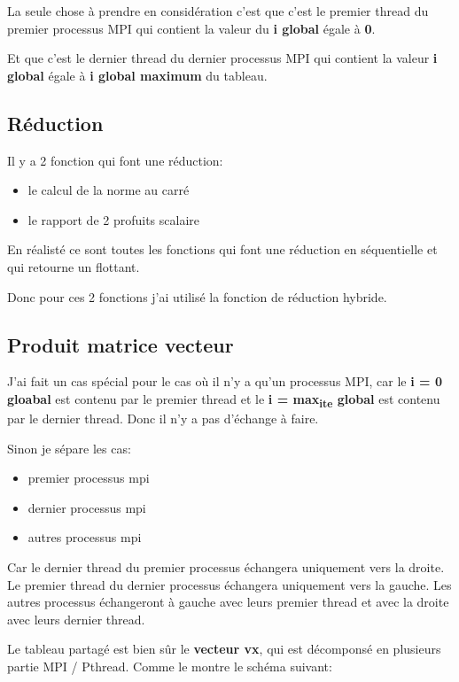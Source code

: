 \documentclass[11pt]{article}
\begin{document}
La seule chose à prendre en considération c'est que c'est le premier thread
du premier processus MPI qui contient la valeur du \textbf{i global} égale à \textbf{0}.

Et que c'est le dernier thread du dernier processus MPI qui contient la
valeur \textbf{i global} égale à \textbf{i global maximum} du tableau.

\subsection{Réduction}
\label{sec:orgbcc62b7}

Il y a 2 fonction qui font une réduction:
\begin{itemize}
\item le calcul de la norme au carré
\item le rapport de 2 profuits scalaire
\end{itemize}


En réalisté ce sont toutes les fonctions qui font une réduction en
séquentielle et qui retourne un flottant.

Donc pour ces 2 fonctions j'ai utilisé la fonction de réduction hybride.

\subsection{Produit matrice vecteur}
\label{sec:orgb18f4cb}

J'ai fait un cas spécial pour le cas où il n'y a qu'un processus MPI, car le
\textbf{i = 0 gloabal} est contenu par le premier thread et le \textbf{i = max\textsubscript{ite} global}
est contenu par le dernier thread. Donc il n'y a pas d'échange à faire.

Sinon je sépare les cas:
\begin{itemize}
\item premier processus mpi
\item dernier processus mpi
\item autres processus mpi
\end{itemize}


Car le dernier thread du premier processus échangera uniquement vers la
droite.
Le premier thread du dernier processus échangera uniquement vers la gauche.
Les autres processus échangeront à gauche avec leurs premier thread et avec
la droite avec leurs dernier thread.

Le tableau partagé est bien sûr le \textbf{vecteur vx}, qui est décomponsé en
plusieurs partie MPI / Pthread. Comme le montre le schéma suivant:
\end{document}
